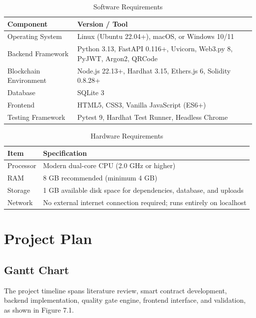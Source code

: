 \documentclass[12pt,a4paper]{report}
\begin{document}
\begin{table}[H]
\centering
\caption{Software Requirements}
\label{tab:sw_req}
\small
\renewcommand{\arraystretch}{1.22}
\begin{tabularx}{\textwidth}{L{4.0cm} Y}
\toprule
\textbf{Component} & \textbf{Version / Tool} \\
\midrule
Operating System & Linux (Ubuntu 22.04+), macOS, or Windows 10/11 \\
Backend Framework & Python 3.13, FastAPI 0.116+, Uvicorn, Web3.py 8, PyJWT, Argon2, QRCode \\
Blockchain Environment & Node.js 22.13+, Hardhat 3.15, Ethers.js 6, Solidity 0.8.28+ \\
Database & SQLite 3 \\
Frontend & HTML5, CSS3, Vanilla JavaScript (ES6+) \\
Testing Framework & Pytest 9, Hardhat Test Runner, Headless Chrome \\
\bottomrule
\end{tabularx}
\end{table}

\begin{table}[H]
\centering
\caption{Hardware Requirements}
\label{tab:hw_req}
\small
\renewcommand{\arraystretch}{1.22}
\begin{tabularx}{\textwidth}{L{4.0cm} Y}
\toprule
\textbf{Item} & \textbf{Specification} \\
\midrule
Processor & Modern dual-core CPU (2.0 GHz or higher) \\
RAM & 8 GB recommended (minimum 4 GB) \\
Storage & 1 GB available disk space for dependencies, database, and uploads \\
Network & No external internet connection required; runs entirely on localhost \\
\bottomrule
\end{tabularx}
\end{table}

\chapter{Project Plan}

\section{Gantt Chart}
The project timeline spans literature review, smart contract development, backend implementation, quality gate engine, frontend interface, and validation, as shown in Figure 7.1.
\end{document}
